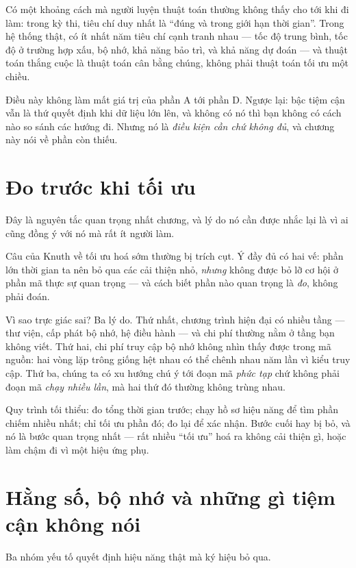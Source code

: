 \documentclass[../../algorithm.tex]{subfiles}
\begin{document}
Có một khoảng cách mà người luyện thuật toán thường không thấy cho tới khi đi làm: trong kỳ thi, tiêu chí duy nhất là ``đúng và trong giới hạn thời gian''. Trong hệ thống thật, có ít nhất năm tiêu chí cạnh tranh nhau --- tốc độ trung bình, tốc độ ở trường hợp xấu, bộ nhớ, khả năng bảo trì, và khả năng dự đoán --- và thuật toán thắng cuộc là thuật toán cân bằng chúng, không phải thuật toán tối ưu một chiều.

Điều này không làm mất giá trị của phần A tới phần D. Ngược lại: bậc tiệm cận vẫn là thứ quyết định khi dữ liệu lớn lên, và không có nó thì bạn không có cách nào so sánh các hướng đi. Nhưng nó là \emph{điều kiện cần chứ không đủ}, và chương này nói về phần còn thiếu.

\section{Đo trước khi tối ưu}

Đây là nguyên tắc quan trọng nhất chương, và lý do nó cần được nhắc lại là vì ai cũng đồng ý với nó mà rất ít người làm.

Câu của Knuth về tối ưu hoá sớm\cite{knuth1974goto} thường bị trích cụt. Ý đầy đủ có hai vế: phần lớn thời gian ta nên bỏ qua các cải thiện nhỏ, \emph{nhưng} không được bỏ lỡ cơ hội ở phần mã thực sự quan trọng --- và cách biết phần nào quan trọng là \emph{đo}, không phải đoán.

Vì sao trực giác sai? Ba lý do. Thứ nhất, chương trình hiện đại có nhiều tầng --- thư viện, cấp phát bộ nhớ, hệ điều hành --- và chi phí thường nằm ở tầng bạn không viết. Thứ hai, chi phí truy cập bộ nhớ không nhìn thấy được trong mã nguồn: hai vòng lặp trông giống hệt nhau có thể chênh nhau năm lần vì kiểu truy cập. Thứ ba, chúng ta có xu hướng chú ý tới đoạn mã \emph{phức tạp} chứ không phải đoạn mã \emph{chạy nhiều lần}, mà hai thứ đó thường không trùng nhau.

Quy trình tối thiểu: đo tổng thời gian trước; chạy hồ sơ hiệu năng để tìm phần chiếm nhiều nhất; chỉ tối ưu phần đó; đo lại để xác nhận. Bước cuối hay bị bỏ, và nó là bước quan trọng nhất --- rất nhiều ``tối ưu'' hoá ra không cải thiện gì, hoặc làm chậm đi vì một hiệu ứng phụ.

\section{Hằng số, bộ nhớ và những gì tiệm cận không nói}

Ba nhóm yếu tố quyết định hiệu năng thật mà ký hiệu \Ob{\cdot} bỏ qua.
\end{document}
